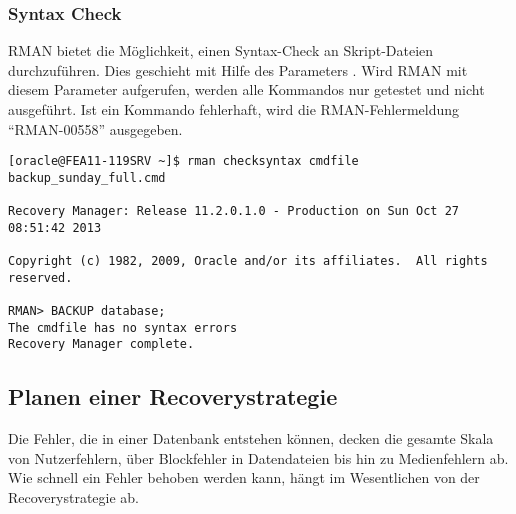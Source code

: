         \subsubsection{Syntax Check}
          RMAN bietet die M\"oglichkeit, einen Syntax-Check an Skript-Dateien durchzuf\"uhren. Dies geschieht mit Hilfe des Parameters . Wird RMAN mit diesem Parameter aufgerufen, werden alle Kommandos nur getestet und nicht ausgef\"uhrt. Ist ein Kommando fehlerhaft, wird die RMAN-Fehlermeldung \enquote{RMAN-00558} ausgegeben.
          \begin{lstlisting}[caption={Ein RMAN-Skript auf korrekte Syntax \"uberpr\"ufen},label=admin1362,language=rman]
[oracle@FEA11-119SRV ~]$ rman checksyntax cmdfile backup_sunday_full.cmd

Recovery Manager: Release 11.2.0.1.0 - Production on Sun Oct 27 08:51:42 2013

Copyright (c) 1982, 2009, Oracle and/or its affiliates.  All rights reserved.

RMAN> BACKUP database;
The cmdfile has no syntax errors
Recovery Manager complete.
          \end{lstlisting}
      \subsection{Planen einer Recoverystrategie}
        Die Fehler, die in einer Datenbank entstehen k\"onnen, decken die
        gesamte Skala von Nutzer\-fehlern, \"uber Blockfehler in Datendateien
        bis hin zu Medienfehlern ab. Wie schnell ein Fehler behoben
        werden kann, h\"angt im Wesentlichen von der Recoverystrategie ab.

